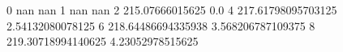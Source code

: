 0 nan nan
1 nan nan
2 215.07666015625 0.0
4 217.61798095703125 2.54132080078125
6 218.64486694335938 3.568206787109375
8 219.30718994140625 4.23052978515625
